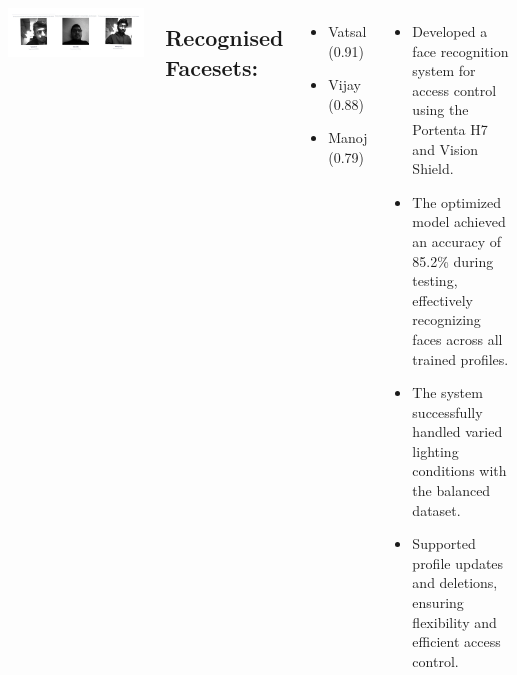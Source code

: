 \documentclass[25pt,a0paper, portrait]{tikzposter}
\begin{document}
\begin{columns}
{			\begin{tikzfigure}
				
				\includegraphics[width=\linewidth]{images/faceresult}
				
			\end{tikzfigure}
			\subsection*{Recognised Facesets:} 
			\begin{itemize}
				\item Vatsal (0.91)
				\item Vijay (0.88)
				\item Manoj (0.79)
			\end{itemize}	
			
			
		}
		
		{
	\begin{itemize}
		\item Developed a face recognition system for access control using the Portenta H7 and Vision Shield.
		\item The optimized model achieved an accuracy of 85.2\% during testing, effectively recognizing faces across all trained profiles.
		\item The system successfully handled varied lighting conditions with the balanced dataset.
		\item Supported profile updates and deletions, ensuring flexibility and efficient access control.
	\end{itemize}

		}
		
		
		
		{			
			\small
			
			
			
			
		}
		
		
	\end{columns}
	
\end{document}
